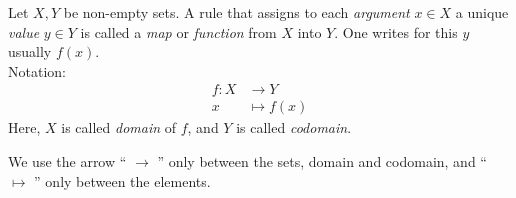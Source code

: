 

\begin{Definition}%
Let $X,Y$ be non-empty sets. A rule 
that assigns to 
each \emph{argument} $x\in X$ a unique \emph{value} $y\in Y$
is called a \emph{map} or \emph{function}
from $X$ into $Y$. One writes for this $y$ usually $f(x)$.\\[0.5em]
Notation:\\[-2em]
\begin{align*}
f:X &\rightarrow Y \\
x &\mapsto f(x)
\end{align*}
Here, $X$ is called \emph{domain} of $f$, and $Y$ is called \emph{codomain}. 
\end{Definition} 

\begin{Attention}
We use the arrow `` $\to$ '' only between the sets, domain and codomain,
and `` $\mapsto$ '' only between the elements.
\end{Attention}

